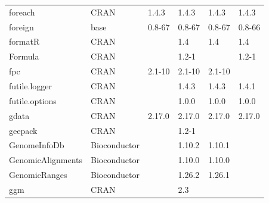 \begin{longtable}{llllll}
\rowcolor{black!5}
foreach                       & \acrshort{CRAN}                      & 1.4.3       & 1.4.3       & 1.4.3          & 1.4.3              \\
\rowcolor{black!10}
foreign                       & base                      & 0.8-67      & 0.8-67      & 0.8-67         & 0.8-66            \\
\rowcolor{black!5}
formatR                       & \acrshort{CRAN}                      &             & 1.4         & 1.4            & 1.4                \\
\rowcolor{black!10}
Formula                       & \acrshort{CRAN}                      &             & 1.2-1       &                & 1.2-1             \\
\rowcolor{black!5}
fpc                           & \acrshort{CRAN}                      & 2.1-10      & 2.1-10      & 2.1-10         &                    \\
\rowcolor{black!10}
futile.logger                 & \acrshort{CRAN}                      &             & 1.4.3       & 1.4.3          & 1.4.1             \\
\rowcolor{black!5}
futile.options                & \acrshort{CRAN}                      &             & 1.0.0       & 1.0.0          & 1.0.0              \\
\rowcolor{black!10}
gdata                         & \acrshort{CRAN}                      & 2.17.0      & 2.17.0      & 2.17.0         & 2.17.0            \\
\rowcolor{black!5}
geepack                       & \acrshort{CRAN}                      &             & 1.2-1       &                &                    \\
\rowcolor{black!10}
GenomeInfoDb                  & Bioconductor              &             & 1.10.2      & 1.10.1         &                   \\
\rowcolor{black!5}
GenomicAlignments             & Bioconductor              &             & 1.10.0      & 1.10.0         &                    \\
\rowcolor{black!10}
GenomicRanges                 & Bioconductor              &             & 1.26.2      & 1.26.1         &                   \\
\rowcolor{black!5}
ggm                           & \acrshort{CRAN}                      &             & 2.3         &                &                    \\

\end{longtable}
